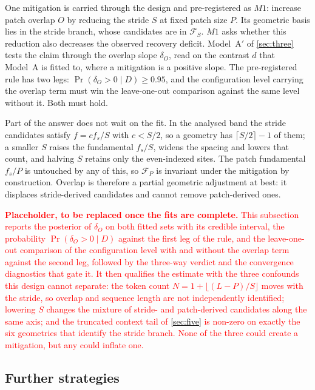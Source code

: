 One mitigation is carried through the design and pre-registered as $M1$: increase patch overlap $O$ by reducing the stride $S$ at fixed patch size $P$. Its geometric basis lies in the stride branch, whose candidates are in $\mathcal{F}_{S}$. $M1$ asks whether this reduction also decreases the observed recovery deficit. Model~A$'$ of \autoref{sec:three} tests the claim through the overlap slope $\delta_O$, read on the contrast $d$ that Model~A is fitted to, where a mitigation is a positive slope. The pre-registered rule has two legs: $\Pr(\delta_O>0\mid D)\geq0.95$, and the configuration level carrying the overlap term must win the leave-one-out comparison against the same level without it. Both must hold.

Part of the answer does not wait on the fit. In the analysed band the stride candidates satisfy $f=cf_s/S$ with $c<S/2$, so a geometry has $\lceil S/2\rceil-1$ of them; a smaller $S$ raises the fundamental $f_s/S$, widens the spacing and lowers that count, and halving $S$ retains only the even-indexed sites. The patch fundamental $f_s/P$ is untouched by any of this, so $\mathcal{F}_{P}$ is invariant under the mitigation by construction. Overlap is therefore a partial geometric adjustment at best: it displaces stride-derived candidates and cannot remove patch-derived ones.

\textcolor{red}{\textbf{Placeholder, to be replaced once the fits are complete.} This subsection reports the posterior of $\delta_O$ on both fitted sets with its credible interval, the probability $\Pr(\delta_O>0\mid D)$ against the first leg of the rule, and the leave-one-out comparison of the configuration level with and without the overlap term against the second leg, followed by the three-way verdict and the convergence diagnostics that gate it. It then qualifies the estimate with the three confounds this design cannot separate: the token count $N=1+\lfloor(L-P)/S\rfloor$ moves with the stride, so overlap and sequence length are not independently identified; lowering $S$ changes the mixture of stride- and patch-derived candidates along the same axis; and the truncated context tail of \autoref{sec:five} is non-zero on exactly the six geometries that identify the stride branch. None of the three could create a mitigation, but any could inflate one.}

\subsection*{Further strategies}

